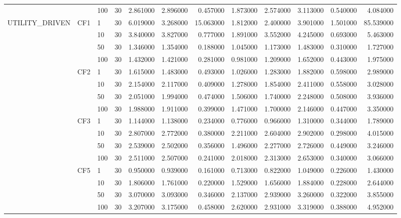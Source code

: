\begin{tabular}{lllrrrrrrrrr}
 &  & 100 & 30 & 2.861000 & 2.896000 & 0.457000 & 1.873000 & 2.574000 & 3.113000 & 0.540000 & 4.084000 \\
\cline{1-12} \cline{2-12}
\multirow[t]{16}{*}{UTILITY_DRIVEN} & \multirow[t]{4}{*}{CF1} & 1 & 30 & 6.019000 & 3.268000 & 15.063000 & 1.812000 & 2.400000 & 3.901000 & 1.501000 & 85.539000 \\
 &  & 10 & 30 & 3.840000 & 3.827000 & 0.777000 & 1.891000 & 3.552000 & 4.245000 & 0.693000 & 5.463000 \\
 &  & 50 & 30 & 1.346000 & 1.354000 & 0.188000 & 1.045000 & 1.173000 & 1.483000 & 0.310000 & 1.727000 \\
 &  & 100 & 30 & 1.432000 & 1.421000 & 0.281000 & 0.981000 & 1.209000 & 1.652000 & 0.443000 & 1.975000 \\
\cline{2-12}
 & \multirow[t]{4}{*}{CF2} & 1 & 30 & 1.615000 & 1.483000 & 0.493000 & 1.026000 & 1.283000 & 1.882000 & 0.598000 & 2.989000 \\
 &  & 10 & 30 & 2.154000 & 2.117000 & 0.409000 & 1.278000 & 1.854000 & 2.411000 & 0.558000 & 3.028000 \\
 &  & 50 & 30 & 2.051000 & 1.994000 & 0.474000 & 1.506000 & 1.740000 & 2.248000 & 0.508000 & 3.936000 \\
 &  & 100 & 30 & 1.988000 & 1.911000 & 0.399000 & 1.471000 & 1.700000 & 2.146000 & 0.447000 & 3.350000 \\
\cline{2-12}
 & \multirow[t]{4}{*}{CF3} & 1 & 30 & 1.144000 & 1.138000 & 0.234000 & 0.776000 & 0.966000 & 1.310000 & 0.344000 & 1.789000 \\
 &  & 10 & 30 & 2.807000 & 2.772000 & 0.380000 & 2.211000 & 2.604000 & 2.902000 & 0.298000 & 4.015000 \\
 &  & 50 & 30 & 2.539000 & 2.502000 & 0.356000 & 1.496000 & 2.277000 & 2.726000 & 0.449000 & 3.246000 \\
 &  & 100 & 30 & 2.511000 & 2.507000 & 0.241000 & 2.018000 & 2.313000 & 2.653000 & 0.340000 & 3.066000 \\
\cline{2-12}
 & \multirow[t]{4}{*}{CF5} & 1 & 30 & 0.950000 & 0.939000 & 0.161000 & 0.713000 & 0.822000 & 1.049000 & 0.226000 & 1.430000 \\
 &  & 10 & 30 & 1.806000 & 1.761000 & 0.220000 & 1.529000 & 1.656000 & 1.884000 & 0.228000 & 2.644000 \\
 &  & 50 & 30 & 3.070000 & 3.093000 & 0.346000 & 2.137000 & 2.939000 & 3.260000 & 0.322000 & 3.855000 \\
 &  & 100 & 30 & 3.207000 & 3.175000 & 0.458000 & 2.620000 & 2.931000 & 3.319000 & 0.388000 & 4.952000 \\

\end{tabular}
